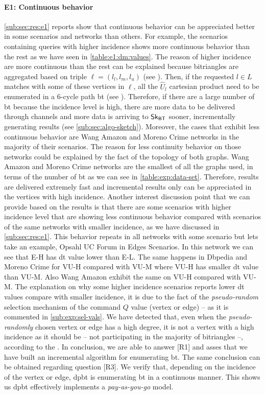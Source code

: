 \paragraph{E1: Continuous behavior} \autoref{sub:sec:res:e1} reports show that continuous behavior can be appreciated better in some scenarios and networks than others. For example, the scenarios containing queries with higher incidence shows more continuous behavior than the rest as we have seen in \autoref{table:e1:dm:values}. 
The reason of higher incidence are more continuous than the rest can be explained because bitriangles are aggregated based on triple $\ell = (l_l,l_m,l_u)$ (see ). Then, if the requested $l \in L$ matches with some of these vertices in $\ell$, all the $\hat{U}_l$ cartesian product need to be enumerated in a 6-cycle path \acrshort{bt} (see ). 
Therefore, if there are a large number of \acrshort{bt} because the incidence level is high, there are more data to be delivered through channels and more data is arriving to $\mathsf{Sk_{BT}}$ sooner, incrementally generating results (see \autoref{sub:sec:algo-sketch}).
Moreover, the cases that exhibit less continuous behavior are Wang Amazon and Moreno Crime networks in the majority of their scenarios. The reason for less continuity behavior on those networks could be explained by the fact of the topology of both graphs. 
Wang Amazon and Moreno Crime networks are the smallest of all the graphs used, in terms of the number of \acrshort{bt} as we can see in \autoref{table:exp:data-set}.
Therefore, results are delivered extremely fast and incremental results only can be appreciated in the vertices with high incidence.
Another interest discussion point that we can provide based on the results is that there are some scenarios with higher incidence level that are showing less continuous behavior compared with scenarios of the same networks with smaller incidence, as we have discussed in \autoref{sub:sec:res:e1}.
This behavior repeats in all networks with some scenario but lets take an example, Opsahl UC Forum in Edges Scenarios. In this network we can see that E-H has \acrshort{dt} value lower than E-L. 
The same happens in Dbpedia and Moreno Crime for VU-H compared with VU-M where VU-H has smaller \acrshort{dt} value than VU-M. Also Wang Amazon exhibit the same on VU-H compared with VU-M.
The explanation on why some higher incidence scenarios reports lower \acrshort{dt} values compare with smaller incidence, it is due to the fact of the \emph{pseudo-random} selection mechanism of the command $Q$ value (vertex or edge) -- as it is commented in \autoref{sub:exp:sel-vals}. 
We have detected that, even when the \emph{pseudo-randomly} chosen vertex or edge has a high degree, it is not a vertex with a high incidence as it should be -- not participating in the majority of bitriangles --, according to the .
In conclusion, we are able to answer [R1] and asses that we have built an incremental algorithm for enumerating \acrlong{bt}. 
The same conclusion can be obtained regarding question [R3]. We verify that, depending on the incidence of the vertex or edge, \acrshort{dpbt} is enumerating \acrshort{bt} in a continuous manner. This shows us \acrshort{dpbt} effectively implements a \emph{pay-as-you-go} model.

